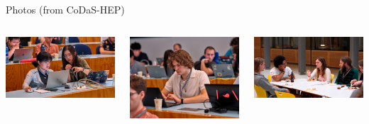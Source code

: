 \documentclass[aspectratio=169]{beamer}
\begin{document}
\begin{frame}{Photos (from CoDaS-HEP)}
\vspace{0.5 cm}
\begin{columns}
\includegraphics[width=\linewidth]{PHOTOS/DSCF2628.jpg}

\includegraphics[width=\linewidth]{PHOTOS/DSCF2637.jpg}

\includegraphics[width=\linewidth]{PHOTOS/DSCF2962.jpg}


\end{columns}
\end{frame}
\end{document}
